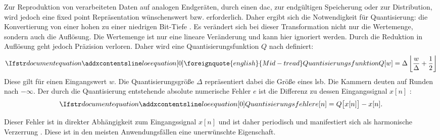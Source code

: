 Zur Reproduktion von verarbeiteten Daten auf analogen Endgeräten, durch einen \gls{dac}, zur endgültigen Speicherung oder zur Distribution, wird jedoch eine \gls{fixed point} Repräsentation wünschenswert bzw. erforderlich.
Daher ergibt sich die Notwendigkeit für Quantisierung: die Konvertierung von einer hohen zu einer niedrigen Bit-Tiefe \autocite[S. 499]{dither}.
Es verändert sich bei dieser Transformation nicht nur die Wertemenge, sondern auch die Auflösung.
Die Wertemenge ist nur eine lineare Veränderung und kann hier ignoriert werden.
Durch die Reduktion in Auflösung geht jedoch Präzision verloren.
Daher wird eine Quantisierungsfunktion $Q$ nach \citeauthor{dither} \autocite[S. 500]{dither} definiert:
\begin{equation}
    \setequationentry{\foreignquote{english}{Mid-tread} Quantisierungsfunktion}
    \label{eq:quantizer}
    Q[w] = \Delta \left\lfloor \frac{w}{\Delta} + \frac{1}{2} \right\rfloor
\end{equation}
Diese gilt für einen Eingangswert $w$.
Die Quantisierungsgröße $\Delta$ repräsentiert dabei die Größe eines \gls{lsb}.
Die Kammern deuten auf Runden nach $-\infty$.
Der durch die Quantisierung entstehende absolute numerische Fehler $e$ ist die Differenz zu dessen Eingangssignal $x[n]$ \autocite[S. 500]{dither}:
\begin{equation}
\setequationentry{Quantisierungsfehler}
e[n] = Q\bigl[x[n]\bigr] - x[n].
\end{equation}

Dieser Fehler ist in direkter Abhängigkeit zum Eingangssignal $x[n]$ und ist daher periodisch und manifestiert sich als harmonische Verzerrung \autocite[S. 500]{dither}\autocite[S. 147]{noise-shaping}.
Diese ist in den meisten Anwendungsfällen eine unerwünschte Eigenschaft.


